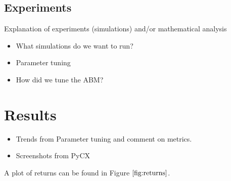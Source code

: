 \documentclass[11pt]{article}
\begin{document}
 






















\subsection{Experiments} %

Explanation of experiments (simulations) and/or mathematical analysis

\begin{itemize}
\item What simulations do we want to run?
\item Parameter tuning
\item \quad How did we tune the ABM?
\end{itemize}























\section{Results}  

\begin{itemize}
\item Trends from Parameter tuning and comment on metrics.
\item Screenshots from PyCX
\end{itemize}





A plot of returns can be found in Figure $\ref{fig:returns}$.
\end{document}
